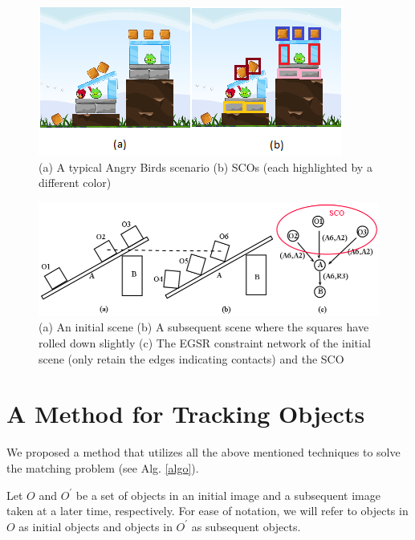 \documentclass[letterpaper]{article}
\begin{document}
\begin{figure}[h!]
\centering\includegraphics[scale=0.7]{SCOScenario.png}\caption{(a) A typical Angry Birds scenario (b) SCOs (each highlighted by a different color)}
\label{SCOExample}
\end{figure}

\begin{figure}[h!]
\centering\includegraphics[scale=0.3]{SpatiallyCorrelatdScenario.png}\caption{(a) An initial scene (b) A subsequent scene where the squares have rolled down slightly (c) The EGSR constraint network of the initial scene (only retain the edges indicating contacts) and the SCO}
\label{SCOExample_2}
\end{figure}


\section{A Method for Tracking Objects}

We proposed a method that utilizes all the above mentioned techniques to solve the matching problem (see Alg. \ref{algo}).

Let $O$ and $O^{\prime}$ be a set of objects in an initial image and a subsequent image taken at a later time, respectively. For ease of notation, we will refer to objects in $O$ as initial objects and objects in $O^{\prime}$ as subsequent objects.
\end{document}
